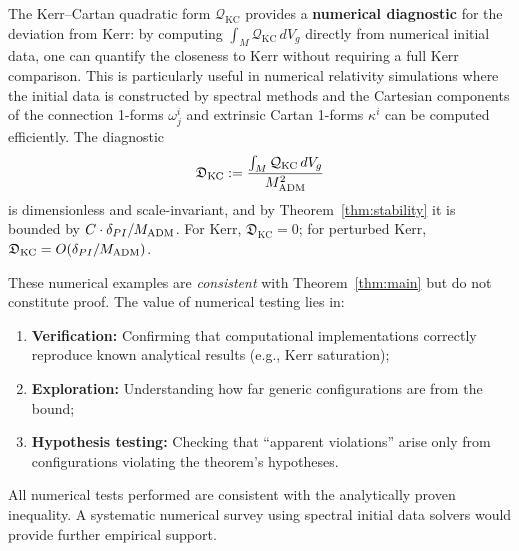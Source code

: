 \begin{remark}
The Kerr--Cartan quadratic form $\mathcal{Q}_{\mathrm{KC}}$ provides a \textbf{numerical diagnostic} for the deviation from Kerr: by computing $\int_M \mathcal{Q}_{\mathrm{KC}} \, dV_g$ directly from numerical initial data, one can quantify the closeness to Kerr without requiring a full Kerr comparison. This is particularly useful in numerical relativity simulations where the initial data is constructed by spectral methods and the Cartesian components of the connection 1-forms $\omega^i_j$ and extrinsic Cartan 1-forms $\kappa^i$ can be computed efficiently. The diagnostic
\begin{equation}
\mathfrak{D}_{\mathrm{KC}} := \frac{\int_M \mathcal{Q}_{\mathrm{KC}} \, dV_g}{M_{\mathrm{ADM}}^2}
\end{equation}
is dimensionless and scale-invariant, and by Theorem~\ref{thm:stability} it is bounded by $C \cdot \delta_{PI}/M_{\mathrm{ADM}}$. For Kerr, $\mathfrak{D}_{\mathrm{KC}} = 0$; for perturbed Kerr, $\mathfrak{D}_{\mathrm{KC}} = O(\delta_{PI}/M_{\mathrm{ADM}})$.
\end{remark}

\begin{remark}
These numerical examples are \emph{consistent} with Theorem~\ref{thm:main} but do not constitute proof. The value of numerical testing lies in:
\begin{enumerate}[label=(\arabic*)]
    \item \textbf{Verification:} Confirming that computational implementations correctly reproduce known analytical results (e.g., Kerr saturation);
    \item \textbf{Exploration:} Understanding how far generic configurations are from the bound;
    \item \textbf{Hypothesis testing:} Checking that ``apparent violations'' arise only from configurations violating the theorem's hypotheses.
\end{enumerate}
All numerical tests performed are consistent with the analytically proven inequality. A systematic numerical survey using spectral initial data solvers would provide further empirical support.
\end{remark}

